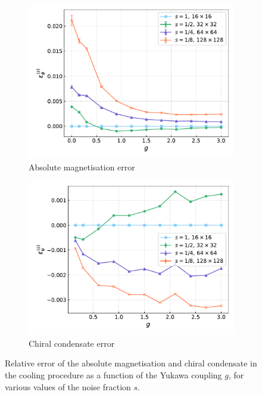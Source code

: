 \begin{figure}[htp]
    \centering
    \begin{subfigure}[b]{0.47\textwidth}
        \includegraphics[width=\textwidth]{figures/cooling/yukawa_scan/deviation.pdf}
        \caption{Absolute magnetisation error}
    \end{subfigure}
    \begin{subfigure}[b]{0.47\textwidth}
        \includegraphics[width=\textwidth]{figures/cooling/yukawa_scan/deviation_cond.pdf}
        \caption{Chiral condensate error}
    \end{subfigure}
    \caption[Relative error in the cooling procedure at tree level as a function of the Yukawa coupling.]{Relative error of the absolute magnetisation and chiral condensate in the cooling procedure as a function of the Yukawa coupling $g$, for various values of the noise fraction $s$.}
    \label{fig:cooling_deviation_yukawa}
\end{figure} \\
